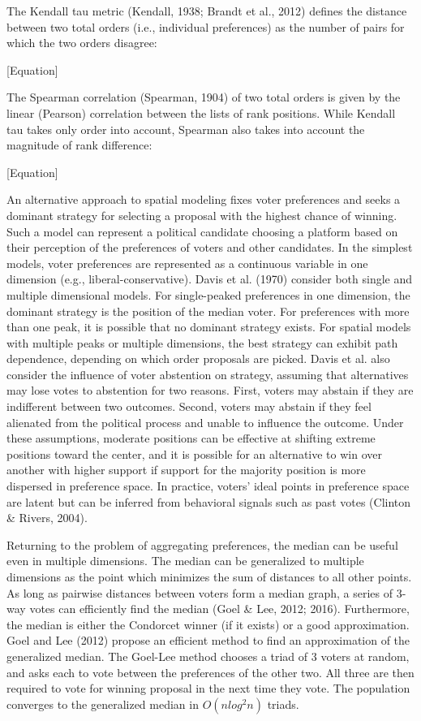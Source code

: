 The Kendall tau metric (Kendall, 1938; Brandt et al., 2012) defines the distance between two total orders (i.e., individual preferences) as the number of pairs for which the two orders disagree:

[Equation]

The Spearman correlation (Spearman, 1904) of two total orders is given by the linear (Pearson) correlation between the lists of rank positions. While Kendall tau takes only order into account, Spearman also takes into account the magnitude of rank difference:

[Equation]

An alternative approach to spatial modeling fixes voter preferences and seeks a dominant strategy for selecting a proposal with the highest chance of winning. Such a model can represent a political candidate choosing a platform based on their perception of the preferences of voters and other candidates. In the simplest models, voter preferences are represented as a continuous variable in one dimension (e.g., liberal-conservative). Davis et al. (1970) consider both single and multiple dimensional models. For single-peaked preferences in one dimension, the dominant strategy is the position of the median voter. For preferences with more than one peak, it is possible that no dominant strategy exists. For spatial models with multiple peaks or multiple dimensions, the best strategy can exhibit path dependence, depending on which order proposals are picked. Davis et al. also consider the influence of voter abstention on strategy, assuming that alternatives may lose votes to abstention for two reasons. First, voters may abstain if they are indifferent between two outcomes. Second, voters may abstain if they feel alienated from the political process and unable to influence the outcome. Under these assumptions, moderate positions can be effective at shifting extreme positions toward the center, and it is possible for an alternative to win over another with higher support if support for the majority position is more dispersed in preference space. In practice, voters’ ideal points in preference space are latent but can be inferred from behavioral signals such as past votes (Clinton \& Rivers, 2004).

Returning to the problem of aggregating preferences, the median can be useful even in multiple dimensions. The median can be generalized to multiple dimensions as the point which minimizes the sum of distances to all other points. As long as pairwise distances between voters form a median graph, a series of 3-way votes can efficiently find the median (Goel \& Lee, 2012; 2016). Furthermore, the median is either the Condorcet winner (if it exists) or a good approximation. Goel and Lee (2012) propose an efficient method to find an approximation of the generalized median. The Goel-Lee method chooses a triad of 3 voters at random, and asks each to vote between the preferences of the other two. All three are then required to vote for winning proposal in the next time they vote. The population converges to the generalized median in $O(n log^2 n)$ triads.

